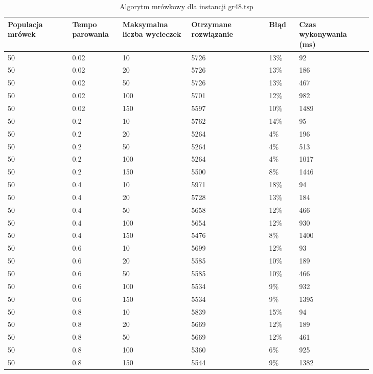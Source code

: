 \documentclass[12pt,a4paper,titlepage]{article}
\begin{document}
\begin{table}[H]
	\caption{Algorytm mrówkowy dla instancji gr48.tsp}
    \centering
	\begin{tabular}{|p{0.15\linewidth}|p{0.10\linewidth}|p{0.16\linewidth}|p{0.18\linewidth}|p{0.07\linewidth}|p{0.17\linewidth}|}
		\hline
        Populacja mrówek & Tempo parowania & Maksymalna liczba \newline wycieczek & Otrzymane rozwiązanie & Błąd & Czas \newline wykonywania (ms) \\
		\hline
        50 & 0.02 & 10 & 5726 & 13\% & 92 \\
        50 & 0.02 & 20 & 5726 & 13\% & 186 \\
        50 & 0.02 & 50 & 5726 & 13\% & 467 \\
        50 & 0.02 & 100 & 5701 & 12\% & 982 \\
        50 & 0.02 & 150 & 5597 & 10\% & 1489 \\
        \hline
        50 & 0.2 & 10 & 5762 & 14\% & 95 \\
        50 & 0.2 & 20 & 5264 & 4\% & 196 \\
        50 & 0.2 & 50 & 5264 & 4\% & 513 \\
        50 & 0.2 & 100 & 5264 & 4\% & 1017 \\
        50 & 0.2 & 150 & 5500 & 8\% & 1446 \\
        \hline
        50 & 0.4 & 10 & 5971 & 18\% & 94 \\
        50 & 0.4 & 20 & 5728 & 13\% & 184 \\
        50 & 0.4 & 50 & 5658 & 12\% & 466 \\
        50 & 0.4 & 100 & 5654 & 12\% & 930 \\
        50 & 0.4 & 150 & 5476 & 8\% & 1400 \\
        \hline
        50 & 0.6 & 10 & 5699 & 12\% & 93 \\
        50 & 0.6 & 20 & 5585 & 10\% & 189 \\
        50 & 0.6 & 50 & 5585 & 10\% & 466 \\
        50 & 0.6 & 100 & 5534 & 9\% & 932 \\
        50 & 0.6 & 150 & 5534 & 9\% & 1395 \\
        \hline
        50 & 0.8 & 10 & 5839 & 15\% & 94 \\
        50 & 0.8 & 20 & 5669 & 12\% & 189 \\
        50 & 0.8 & 50 & 5669 & 12\% & 461 \\
        50 & 0.8 & 100 & 5360 & 6\% & 925 \\
        50 & 0.8 & 150 & 5544 & 9\% & 1382 \\
        \hline
    \end{tabular}
\end{table}
\end{document}
